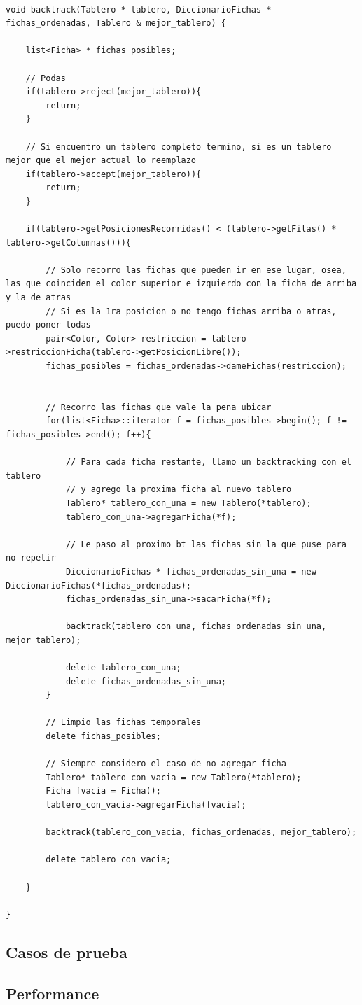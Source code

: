 \begin{lstlisting}

void backtrack(Tablero * tablero, DiccionarioFichas * fichas_ordenadas, Tablero & mejor_tablero) {
	
	list<Ficha> * fichas_posibles;
	
	// Podas
	if(tablero->reject(mejor_tablero)){ 
		return; 
	}
	
	// Si encuentro un tablero completo termino, si es un tablero mejor que el mejor actual lo reemplazo
	if(tablero->accept(mejor_tablero)){ 
		return; 
	}
	
	if(tablero->getPosicionesRecorridas() < (tablero->getFilas() * tablero->getColumnas())){
				
		// Solo recorro las fichas que pueden ir en ese lugar, osea, las que coinciden el color superior e izquierdo con la ficha de arriba y la de atras
		// Si es la 1ra posicion o no tengo fichas arriba o atras, puedo poner todas
		pair<Color, Color> restriccion = tablero->restriccionFicha(tablero->getPosicionLibre());
		fichas_posibles = fichas_ordenadas->dameFichas(restriccion);
		

		// Recorro las fichas que vale la pena ubicar
		for(list<Ficha>::iterator f = fichas_posibles->begin(); f != fichas_posibles->end(); f++){

			// Para cada ficha restante, llamo un backtracking con el tablero
			// y agrego la proxima ficha al nuevo tablero
			Tablero* tablero_con_una = new Tablero(*tablero);
			tablero_con_una->agregarFicha(*f);

			// Le paso al proximo bt las fichas sin la que puse para no repetir
			DiccionarioFichas * fichas_ordenadas_sin_una = new DiccionarioFichas(*fichas_ordenadas);
			fichas_ordenadas_sin_una->sacarFicha(*f);	

			backtrack(tablero_con_una, fichas_ordenadas_sin_una, mejor_tablero);

			delete tablero_con_una;
			delete fichas_ordenadas_sin_una;
		}
		
		// Limpio las fichas temporales
		delete fichas_posibles;
		
		// Siempre considero el caso de no agregar ficha
		Tablero* tablero_con_vacia = new Tablero(*tablero);
		Ficha fvacia = Ficha();
		tablero_con_vacia->agregarFicha(fvacia);
			
		backtrack(tablero_con_vacia, fichas_ordenadas, mejor_tablero);
		
		delete tablero_con_vacia;
	
	}
	
}

\end{lstlisting}

\newpage

\subsection{Casos de prueba}

\subsection{Performance}
